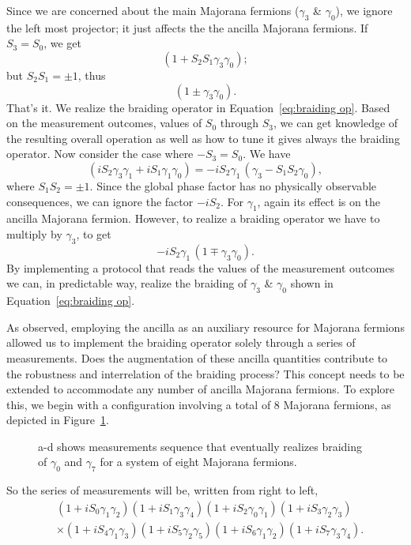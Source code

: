 \documentclass{article}
\begin{document}
Since we are concerned about the main Majorana fermions ($ \gamma_3 $ \& $ \gamma_0 $), we ignore the left most projector; it just affects the the ancilla Majorana fermions.
If $ S_3 = S_0 $, we get
\[
	( 1 + S_2 S_1 \gamma_3 \gamma_0 );
\]
but $ S_2 S_1 = \pm 1 $, thus
\[
	( 1 \pm \gamma_3 \gamma_0 ).
\]
That's it. We realize the braiding operator in Equation~\ref{eq:braiding op}. Based on the measurement outcomes, values of $ S_0 $ through $ S_3 $, we can get knowledge of the resulting overall operation as well as how to tune it gives always the braiding operator. Now consider the case where $ -S_3 = S_0 $. We have
\[
	( iS_2 \gamma_3 \gamma_1 +iS_1 \gamma_1 \gamma_0)
	= -i S_2 \gamma_1\, ( \gamma_3 - S_1 S_2 \gamma_0) ,
\]
where $ S_1 S_2 = \pm 1 $. Since the global phase factor has no physically observable consequences, we can ignore the factor $ -iS_2 $. For $ \gamma_1 $, again its effect is on the ancilla Majorana fermion. However, to realize a braiding operator we have to multiply by $ \gamma_3 $, to get
\[
	-iS_2 \gamma_1\, (1 \mp \gamma_3 \gamma_0).
\]
By implementing a protocol that reads the values of the measurement outcomes we can, in predictable way, realize the braiding of $ \gamma_3 $ \& $ \gamma_0 $ shown in Equation~\ref{eq:braiding op}.

\vspace{12pt}
As observed, employing the ancilla as an auxiliary resource for Majorana fermions allowed us to implement the braiding operator solely through a series of measurements. Does the augmentation of these ancilla quantities contribute to the robustness and interrelation of the braiding process? This concept needs to be extended to accommodate any number of ancilla Majorana fermions. To explore this, we begin with a configuration involving a total of 8 Majorana fermions, as depicted in Figure~\ref{fig:8-conf-meas}.
\begin{figure}
	\begin{center}
		
	\end{center}
	\caption{a-d shows measurements sequence that eventually realizes braiding of $ \gamma_0 $ and $ \gamma_7 $ for a system of eight Majorana fermions.}
	\label{fig:8-conf-meas}
\end{figure}
So the series of measurements will be, written from right to left,
\begin{equation}
	\begin{aligned}
		 & (1+ i S_0 \gamma_1 \gamma_2)(1+ i S_1 \gamma_3 \gamma_4)(1+ i S_2 \gamma_0 \gamma_1) (1+ i S_3 \gamma_2 \gamma_3)         \\
		 & \times (1+ i S_4 \gamma_1 \gamma_3)(1+ i S_5 \gamma_2 \gamma_5)(1+ i S_6 \gamma_1 \gamma_2)(1+ i S_7 \gamma_3 \gamma_4) .
	\end{aligned}
	\label{eq:meas seq 8 mfs}
\end{equation}
\end{document}
